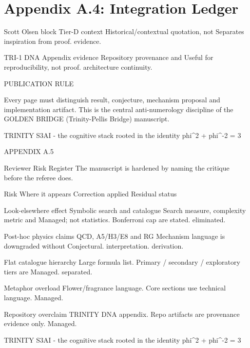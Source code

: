 
\section{Appendix A.4: Integration Ledger}

Scott Olsen block         Tier-D context                   Historical/contextual quotation, not      Separates inspiration from proof.
                                                            evidence.

 TRI-1 DNA                 Appendix evidence                Repository provenance and                 Useful for reproducibility, not proof.
                                                            architecture continuity.

  PUBLICATION RULE

  Every page must distinguish result, conjecture, mechanism proposal and implementation artifact. This is
  the central anti-numerology discipline of the GOLDEN BRIDGE (Trinity-Pellis Bridge) manuscript.

                              TRINITY S3AI - the cognitive stack rooted in the identity phi\textasciicircum{}2 + phi\textasciicircum{}-2 = 3

                                                        APPENDIX A.5

                            Reviewer Risk Register
            The manuscript is hardened by naming the critique before the referee does.

             Risk                    Where it appears                           Correction applied                   Residual status

 Look-elsewhere effect        Symbolic search and catalogue       Search measure, complexity metric and           Managed; not
                              statistics.                         Bonferroni cap are stated.                      eliminated.

 Post-hoc physics claims      QCD, A5/H3/E8 and RG                Mechanism language is downgraded without        Conjectural.
                              interpretation.                     derivation.

 Flat catalogue hierarchy     Large formula list.                 Primary / secondary / exploratory tiers are     Managed.
                                                                  separated.

 Metaphor overload            Flower/fragrance language.          Core sections use technical language.           Managed.

 Repository overclaim         TRINITY DNA appendix.               Repo artifacts are provenance evidence only.    Managed.

                            TRINITY S3AI - the cognitive stack rooted in the identity phi\textasciicircum{}2 + phi\textasciicircum{}-2 = 3